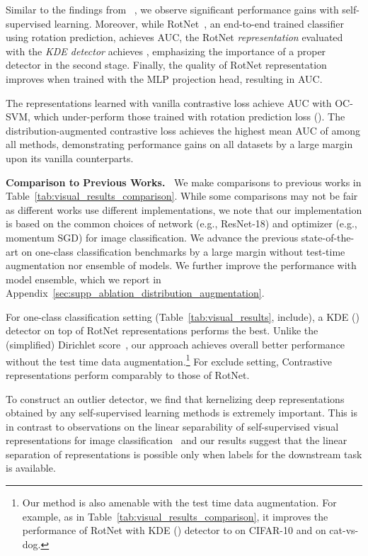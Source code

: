 \documentclass{article} \usepackage{iclr2021_conference,times}
\newcommand{\geotrans}{RotNet}
\newcommand{\contrastive}{Contrastive}
\begin{document}
Similar to the findings from ~\cite{golan2018deep,hendrycks2019using}, we observe significant performance gains with self-supervised learning. Moreover, while {\geotrans}~\citep{golan2018deep}, an end-to-end trained classifier using rotation prediction, achieves  AUC, the {\geotrans} \emph{representation} evaluated with the \emph{KDE detector} achieves , emphasizing the importance of a proper detector in the second stage. Finally, the quality of {\geotrans} representation improves when trained with the MLP projection head, resulting in  AUC.

The representations learned with vanilla contrastive loss achieve  AUC with OC-SVM, which under-perform those trained with rotation prediction loss (). The distribution-augmented contrastive loss achieves the highest mean AUC of  among all methods, demonstrating performance gains on all datasets by a large margin upon its vanilla counterparts. 





\textbf{Comparison to Previous Works.~} We make comparisons to previous works in Table~\ref{tab:visual_results_comparison}. While some comparisons may not be fair as different works use different implementations, we note that our implementation is based on the common choices of network (e.g., ResNet-18) and optimizer (e.g., momentum SGD) for image classification. We advance the previous state-of-the-art on one-class classification benchmarks by a large margin without test-time augmentation nor ensemble of models. We further improve the performance with model ensemble, which we report in Appendix~\ref{sec:supp_ablation_distribution_augmentation}.



\iffalse
For one-class classification setting (Table~\ref{tab:visual_results}, include), a KDE () detector on top of {\geotrans} representations performs the best. Unlike the (simplified) Dirichlet score~\citep{golan2018deep}, our approach achieves overall better performance without the test time data augmentation.\footnote{Our method is also amenable with the test time data augmentation. For example, as in Table~\ref{tab:visual_results_comparison}, it improves the performance of {\geotrans} with KDE () detector to  on CIFAR-10 and  on cat-vs-dog.} For exclude setting, {\contrastive} representations perform comparably to those of {\geotrans}.

To construct an outlier detector, we find that kernelizing deep representations obtained by any self-supervised learning methods is extremely important. This is in contrast to observations on the linear separability of self-supervised visual representations for image classification~\citep{he2020momentum,chen2020simple,wang2020understanding,grill2020bootstrap} and our results suggest that the linear separation of representations is possible only when labels for the downstream task is available.
\end{document}
